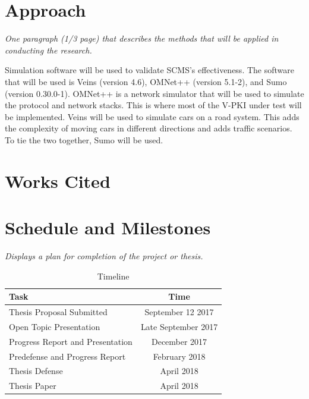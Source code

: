 \documentclass [11pt]{article}
\newcommand{\sechint}[1]{\small{\emph{#1}} \bigskip}
\begin{document}
\section{Approach}{\sechint{One paragraph (1/3 page) that describes the methods that will be applied in conducting the research.}}

Simulation software will be used to validate SCMS's effectiveness.
The software that will be used is Veins (version 4.6), OMNet++ (version 5.1-2), and Sumo (version 0.30.0-1). OMNet++ is a network simulator that will be used to simulate the protocol and network stacks. This is where most of the V-PKI under test will be implemented. Veins will be used to simulate cars on a road system. This adds the complexity of moving cars in different directions and adds traffic scenarios. To tie the two together, Sumo will be used.

\section{Works Cited}
\printbibliography

\section{Schedule and Milestones}{\sechint{Displays a plan for completion of the project or thesis.}}

\begin{table}[!ht]
	\centering
	\begin{tabular}{l|c}
		Task & Time \\ \hline \hline
		Thesis Proposal Submitted & September 12 2017 \\ \hline
		Open Topic Presentation & Late September 2017 \\ \hline
		Progress Report and Presentation & December 2017 \\ \hline
		Predefense and Progress Report & February 2018 \\ \hline
		Thesis Defense & April 2018 \\ \hline
		Thesis Paper & April 2018 \\ \hline
	\end{tabular}
	\caption{Timeline}
\end{table}
\end{document}
